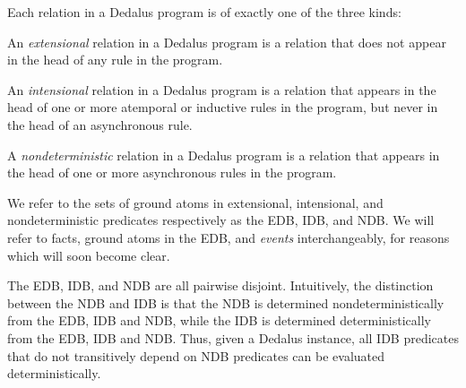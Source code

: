 Each relation in a Dedalus program is of exactly one of the three kinds:


%
%

\begin{definition}
%
An \emph{extensional} relation in a Dedalus program is a relation that does not
appear in the head of any rule in the program.
%
\end{definition}

 \begin{definition}
 An \emph{intensional} relation in a Dedalus program is a relation that appears
 in the head of one or more atemporal or inductive rules in the program, but never in the head of an asynchronous rule.
 \end{definition}

 \begin{definition}
 A \emph{nondeterministic} relation in a Dedalus program is a relation that appears in
 the head of one or more asynchronous rules in the program.
 \end{definition}

 We refer to the sets of ground atoms in extensional, intensional, and nondeterministic
 predicates respectively as the EDB, IDB, and NDB.  We will refer to facts, ground atoms
 in the EDB, and \emph{events} interchangeably, for reasons which will soon become clear.

 The EDB, IDB, and NDB are all pairwise disjoint.  Intuitively, the distinction
 between the NDB and IDB is that the NDB is determined nondeterministically from
 the EDB, IDB and NDB, while the IDB is determined deterministically from the
 EDB, IDB and NDB.  Thus, given a Dedalus instance, all IDB
 predicates that do not transitively depend on NDB predicates can be evaluated
 deterministically.  


